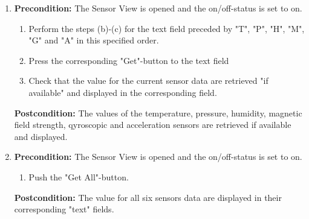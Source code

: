 \documentclass[a4paper]{article}
\newlength{\testlabellength}
\newenvironment{testlist}{\begin{enumerate}[label=\bfseries Instruction \thesubsection.\arabic* , labelindent=0pt, labelwidth=\testlabellength , leftmargin=2cm]}{\end{enumerate}}
\begin{document}
\begin{appendices}
\begin{testlist}
\begin{enumerate}
    			\end{enumerate}
    			\textbf{Postcondition:} There are text fields preceded by "T", "P", "H", "M", "G", "A".

 \item \vspace{5mm} \textbf{Precondition:} The Sensor View is opened and the on/off-status is set to on.
    			\begin{enumerate}
    				\item Perform the steps (b)-(c) for the text field preceded by "T", "P", "H", "M", "G" and "A" in this specified order.
                    \item Press the corresponding "Get"-button to the text field
    				\item Check that the value for the current sensor data are retrieved "if available" and displayed in the corresponding field.
	    			
    			
    			\end{enumerate}
    			\textbf{Postcondition:} The values of the temperature, pressure, humidity, magnetic field strength, qyroscopic and acceleration sensors are retrieved if available and displayed.


 \item \vspace{5mm} \textbf{Precondition:} The Sensor View is opened and the on/off-status is set to on. 
    			\begin{enumerate}
    				\item Push the "Get All"-button.
    			
    			
    			\end{enumerate}
    			\textbf{Postcondition:} The value for all six sensors data are displayed in their corresponding "text" fields.


\end{testlist}
\end{appendices}
\end{document}
